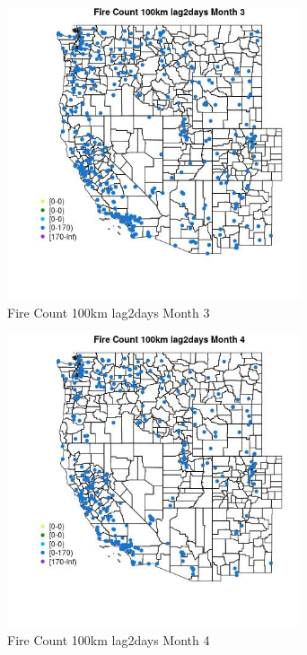 \begin{figure} 
\centering  
\includegraphics[width=0.77\textwidth]{Code_Outputs/Report_ML_input_PM25_Step4_part_e_de_duplicated_aves_compiled_2019-05-18wNAs_MapObsMo3Fire_Count_100km_lag2days.jpg} 
\caption{\label{fig:Report_ML_input_PM25_Step4_part_e_de_duplicated_aves_compiled_2019-05-18wNAsMapObsMo3Fire_Count_100km_lag2days}Fire Count 100km lag2days Month 3} 
\end{figure} 
 

\begin{figure} 
\centering  
\includegraphics[width=0.77\textwidth]{Code_Outputs/Report_ML_input_PM25_Step4_part_e_de_duplicated_aves_compiled_2019-05-18wNAs_MapObsMo4Fire_Count_100km_lag2days.jpg} 
\caption{\label{fig:Report_ML_input_PM25_Step4_part_e_de_duplicated_aves_compiled_2019-05-18wNAsMapObsMo4Fire_Count_100km_lag2days}Fire Count 100km lag2days Month 4} 
\end{figure} 
 

